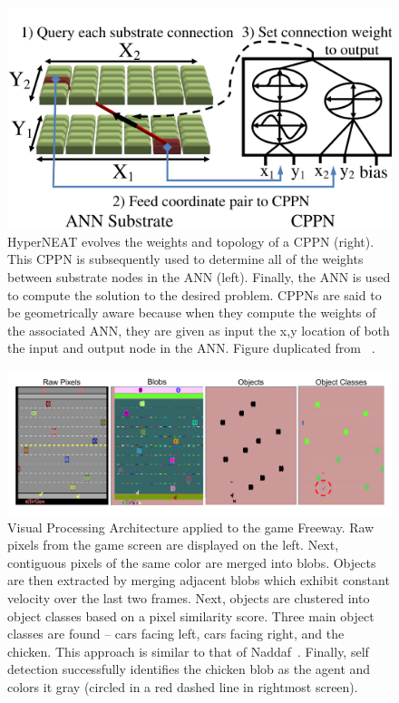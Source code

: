 \documentclass{sig-alternate}
\begin{document}
\begin{figure}[htp]
\begin{center}
\includegraphics[width=\columnwidth]{figures/cppn}
\end{center}
\caption{HyperNEAT evolves the weights and topology of a CPPN (right). This CPPN is subsequently used to determine all of the weights between substrate nodes in the ANN (left). Finally, the ANN is used to compute the solution to the desired problem. CPPNs are said to be geometrically aware because when they compute the weights of the associated ANN, they are given as input the x,y location of both the input and output node in the ANN. Figure duplicated from ~\cite{verbancsics10}.}
\label{fig:cppn}
\end{figure}

\begin{figure}[htp]
\begin{center}
\includegraphics[width=\textwidth]{figures/AtariArch}
\end{center}
\caption{Visual Processing Architecture applied to the game Freeway. Raw pixels from the game screen are displayed on the left. Next, contiguous pixels of the same color are merged into blobs. Objects are then extracted by merging adjacent blobs which exhibit constant velocity over the last two frames. Next, objects are clustered into object classes based on a pixel similarity score. Three main object classes are found -- cars facing left, cars facing right, and the chicken. This approach is similar to that of Naddaf~\cite{naddaf10}. Finally, self detection successfully identifies the chicken blob as the agent and colors it gray (circled in a red dashed line in rightmost screen).}
\label{fig:visproc}
\end{figure}
\end{document}
